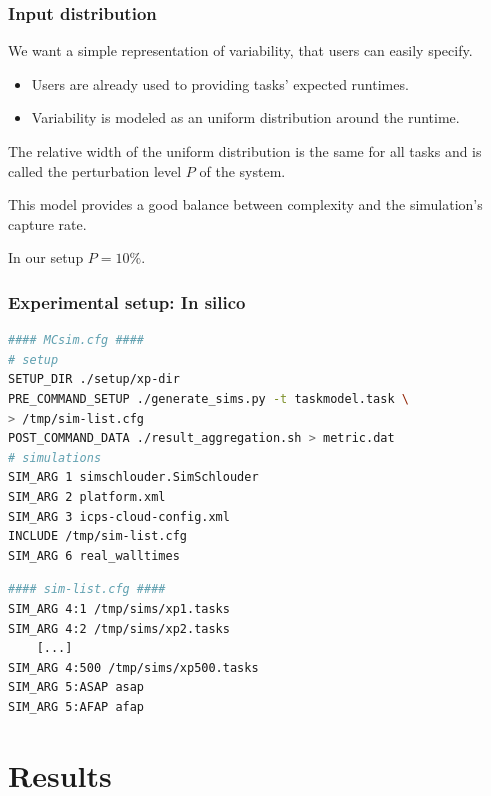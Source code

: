 \documentclass{beamer}
\begin{document}
\begin{frame}
	\frametitle{Input distribution}
	We want a simple representation of variability, that users can
	easily specify.
	\begin{itemize}
		\item Users are already used to providing tasks' expected
			runtimes.
		\item Variability is modeled as an uniform distribution around
			the runtime.
	\end{itemize}
	\bigskip
	\pause
	The relative width of the uniform distribution is the same for all tasks
	and is called the \alert{perturbation level} $P$ of the system.
	\begin{block}{}
		This model provides a good balance between complexity and the
		simulation's capture rate. 
	\end{block}
	\pause
	\begin{center}
	In our setup $P = 10\%$.
\end{center}
\end{frame}

\begin{frame}[fragile]
	\frametitle{Experimental setup: In silico}
\begin{lstlisting}[language=bash,basicstyle=\tt\footnotesize,backgroundcolor=\color{gray!10},
morekeywords={SETUP_DIR,TU_ARG,PRE_COMMAND_SETUP,POST_COMMAND_DATA,SIM_ARG,INCLUDE},
keywordstyle=\color{red!90},commentstyle=\color{blue!70}]
#### MCsim.cfg ####
# setup
SETUP_DIR ./setup/xp-dir
PRE_COMMAND_SETUP ./generate_sims.py -t taskmodel.task \
> /tmp/sim-list.cfg
POST_COMMAND_DATA ./result_aggregation.sh > metric.dat
# simulations
SIM_ARG 1 simschlouder.SimSchlouder
SIM_ARG 2 platform.xml 
SIM_ARG 3 icps-cloud-config.xml
INCLUDE /tmp/sim-list.cfg
SIM_ARG 6 real_walltimes
\end{lstlisting}
\begin{lstlisting}[language=bash,basicstyle=\tt\footnotesize,backgroundcolor=\color{gray!10},
morekeywords={SETUP_DIR,TU_ARG,PRE_COMMAND_SETUP,POST_COMMAND_DATA,SIM_ARG,INCLUDE},
keywordstyle=\color{red!90},commentstyle=\color{blue!70}]
#### sim-list.cfg ####
SIM_ARG 4:1 /tmp/sims/xp1.tasks
SIM_ARG 4:2 /tmp/sims/xp2.tasks
	[...]
SIM_ARG 4:500 /tmp/sims/xp500.tasks
SIM_ARG 5:ASAP asap
SIM_ARG 5:AFAP afap
\end{lstlisting}
\end{frame}


\section{Results}
\end{document}
